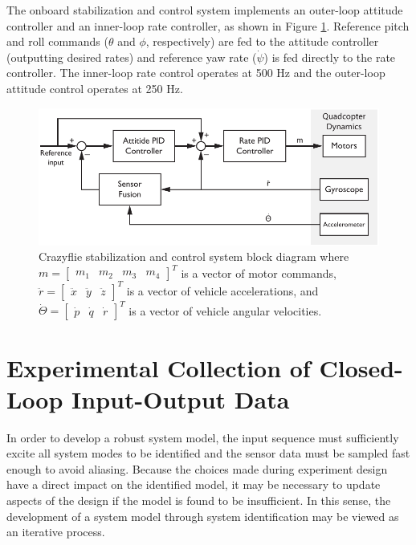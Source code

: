The onboard stabilization and control system implements an outer-loop attitude controller and an inner-loop rate controller, as shown in Figure \ref{fig:control_system_block_diagram}. Reference pitch and roll commands ($\theta$ and $\phi$, respectively) are fed to the attitude controller (outputting desired rates) and reference yaw rate ($\dot\psi$) is fed directly to the rate controller. The inner-loop rate control operates at 500 Hz and the outer-loop attitude control operates at 250 Hz.
\begin{figure}[htb!]
	\centering
	\includegraphics{../fig/crazyflie_control_system_block_diagram.pdf}
	\caption[Crazyflie stabilization and control system block diagram.]{Crazyflie stabilization and control system block diagram where $m = \begin{bmatrix}m_1 & m_2 & m_3 & m_4\end{bmatrix}^T$ is a vector of motor commands, $\ddot{r} = \begin{bmatrix}\ddot{x}&\ddot{y}&\ddot{z}\end{bmatrix}^T$ is a vector of vehicle accelerations, and $\dot\Theta = \begin{bmatrix}\dot{p}&\dot{q}&\dot{r}\end{bmatrix}^T$ is a vector of vehicle angular velocities.}
	\label{fig:control_system_block_diagram}
\end{figure}


\section{Experimental Collection of Closed-Loop Input-Output Data}
In order to develop a robust system model, the input sequence must sufficiently excite all system modes to be identified and the sensor data must be sampled fast enough to avoid aliasing. Because the choices made during experiment design have a direct impact on the identified model, it may be necessary to update aspects of the design if the model is found to be insufficient. In this sense, the development of a system model through system identification may be viewed as an iterative process.

